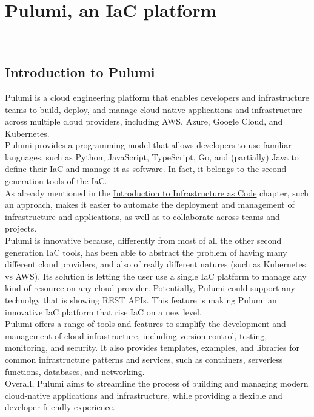 
\chapter{Pulumi, an IaC platform}
\label{cap:introduction-pulumi}

\\

\section{Introduction to Pulumi}
Pulumi is a cloud engineering platform that enables developers and infrastructure teams to build, deploy, and manage cloud-native applications and infrastructure across multiple cloud providers, including AWS, Azure, Google Cloud, and Kubernetes.\\
Pulumi provides a programming model that allows developers to use familiar languages, such as Python, JavaScript, TypeScript, Go, and (partially) Java to define their IaC and manage it as software.
In fact, it belongs to the second generation tools of the IaC.\\
As already mentioned in the \hyperref[cap:introduction-to-iac]{Introduction to Infrastructure as Code} chapter, such an approach, makes it easier to automate the deployment and management of infrastructure and applications, as well as to collaborate across teams and projects.\\
Pulumi is innovative because, differently from most of all the other second generation IaC tools, has been able to abstract the problem of having many different cloud providers, and also of really different natures (such as Kubernetes vs AWS).
Its solution is letting the user use a single IaC platform to manage any kind of resource on any cloud provider.
Potentially, Pulumi could support any technolgy that is showing \gls{REST API}s.
This feature is making Pulumi an innovative IaC platform that rise IaC on a new level.\\
Pulumi offers a range of tools and features to simplify the development and management of cloud infrastructure, including version control, testing, monitoring, and security.
It also provides templates, examples, and libraries for common infrastructure patterns and services, such as containers, serverless functions, databases, and networking.\\
Overall, Pulumi aims to streamline the process of building and managing modern cloud-native applications and infrastructure, while providing a flexible and developer-friendly experience.

